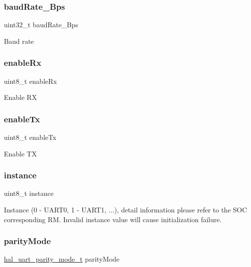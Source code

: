 \subsubsection{\texorpdfstring{baudRate\_Bps}{baudRate\_Bps}}
{\footnotesize\ttfamily uint32\+\_\+t baud\+Rate\+\_\+\+Bps}

Baud rate \mbox{\label{struct__hal__uart__config_aa71c95a745f5bb5f666e55f7c98e4e9f}} 
\subsubsection{\texorpdfstring{enableRx}{enableRx}}
{\footnotesize\ttfamily uint8\+\_\+t enable\+Rx}

Enable RX \mbox{\label{struct__hal__uart__config_a4e1a6dc4f40cf76369024809e1f4163d}} 
\subsubsection{\texorpdfstring{enableTx}{enableTx}}
{\footnotesize\ttfamily uint8\+\_\+t enable\+Tx}

Enable TX \mbox{\label{struct__hal__uart__config_a0247bf27ecd553eeb029a06b1e6ec354}} 
\subsubsection{\texorpdfstring{instance}{instance}}
{\footnotesize\ttfamily uint8\+\_\+t instance}

Instance (0 -\/ U\+A\+R\+T0, 1 -\/ U\+A\+R\+T1, ...), detail information please refer to the S\+OC corresponding RM. Invalid instance value will cause initialization failure. \mbox{\label{struct__hal__uart__config_acbc3e2332cc7a0602c77932e67db0b6f}} 
\subsubsection{\texorpdfstring{parityMode}{parityMode}}
{\footnotesize\ttfamily \mbox{\hyperlink{group___u_a_r_t___adapter_ga24029165f252c4fe925cdb8af52b3b8f}{hal\+\_\+uart\+\_\+parity\+\_\+mode\+\_\+t}} parity\+Mode}

